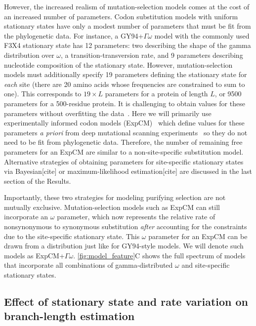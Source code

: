 \documentclass[11pt]{article}
\newcommand\skhcomment[1]{{\color{cyan}[#1]}}
\begin{document}
However, the increased realism of mutation-selection models comes at the cost of an increased number of parameters. 
Codon substitution models with uniform stationary states have only a modest number of parameters that must be fit from the phylogenetic data.
For instance, a GY94+$\Gamma\omega$ model with the commonly used F3X4 stationary state has 12 parameters: two describing the shape of the gamma distribution over $\omega$, a transition-transversion rate, and 9 parameters describing nucleotide composition of the stationary state.
However, mutation-selection models must additionally specify 19 parameters defining the stationary state for \emph{each} site (there are 20 amino acids whose frequencies are constrained to sum to one).
This corresponds to $19\times L$ parameters for a protein of length $L$, or 9500 parameters for a 500-residue protein.
It is challenging to obtain values for these parameters without overfitting the data~\citep{rodrigue2013statistical}.
Here we will primarily use experimentally informed codon models (ExpCM)~\citep{bloom2014experimentally, hilton2017phydms, bloom2017identification} which define values for these parameters \textit{a priori} from deep mutational scanning experiments~\citep{fowler2014deep} so they do not need to be fit from phylogenetic data.
Therefore, the number of remaining free parameters for an ExpCM are similar to a non-site-specific substitution model.
Alternative strategies of obtaining parameters for site-specific stationary states via Bayesian\skhcomment{cite} or maximum-likelihood estimation\skhcomment{cite} are discussed in the last section of the Results.

Importantly, these two strategies for modeling purifying selection are not mutually exclusive.
Mutation-selection models such as ExpCM can still incorporate an $\omega$ parameter, which now represents the relative rate of nonsynonymous to synonymous substitution \emph{after} accounting for the constraints due to the site-specific stationary state.
This $\omega$ parameter for an ExpCM can be drawn from a distribution just like for GY94-style models. 
We will denote such models as ExpCM+$\Gamma\omega$.
\ref{fig:model_feature}C shows the full spectrum of models that incorporate all combinations of gamma-distributed $\omega$ and site-specific stationary states.

\subsection*{Effect of stationary state and rate variation on branch-length estimation}
\end{document}
